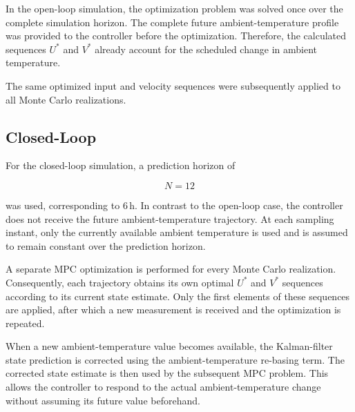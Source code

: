 In the open-loop simulation, the optimization problem was solved once over
the complete simulation horizon. The complete future ambient-temperature
profile was provided to the controller before the optimization. Therefore,
the calculated sequences \(U^\ast\) and \(V^\ast\) already account for the
scheduled change in ambient temperature.

The same optimized input and velocity sequences were subsequently applied to
all Monte Carlo realizations. 




%



\subsection{Closed-Loop}
\label{subsec:district_closed_loop_results}

For the closed-loop simulation, a prediction horizon of

\begin{equation}
    N=12
\end{equation}

was used, corresponding to \(6\,\mathrm{h}\). In contrast to the open-loop
case, the controller does not receive the future ambient-temperature
trajectory. At each sampling instant, only the currently available ambient
temperature is used and is assumed to remain constant over the prediction
horizon.

A separate MPC optimization is performed for every Monte Carlo realization.
Consequently, each trajectory obtains its own optimal \(U^\ast\) and
\(V^\ast\) sequences according to its current state estimate. Only the first
elements of these sequences are applied, after which a new measurement is
received and the optimization is repeated.

When a new ambient-temperature value becomes available, the Kalman-filter
state prediction is corrected using the ambient-temperature re-basing term.
The corrected state estimate is then used by the subsequent MPC problem.
This allows the controller to respond to the actual ambient-temperature
change without assuming its future value beforehand.



